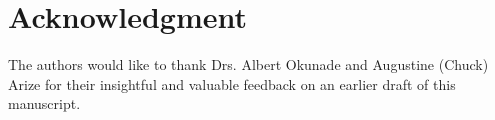 \section*{Acknowledgment}
{\small The authors would like to thank Drs. Albert Okunade and Augustine (Chuck) Arize for their insightful and valuable feedback on an earlier draft of this manuscript.}
